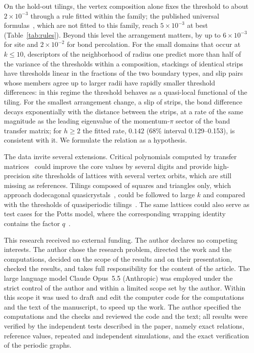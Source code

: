 \documentclass[pre,twocolumn,superscriptaddress,longbibliography,floatfix]{revtex4-2}
\begin{document}
On the hold-out tilings, the vertex composition alone fixes the threshold to about $2\times10^{-3}$ through a rule fitted within the family; the published universal formulas~\cite{GalamMauger96,Neher08,Lebrecht21,GalamMauger98}, which are not fitted to this family, reach $5\times10^{-3}$ at best (Table~\ref{tab:rules}). Beyond this level the arrangement matters, by up to $6\times10^{-3}$ for site and $2\times10^{-2}$ for bond percolation. For the small domains that occur at $k\le10$, descriptors of the neighborhood of radius one predict more than half of the variance of the thresholds within a composition, stackings of identical strips have thresholds linear in the fractions of the two boundary types, and slip pairs whose members agree up to larger radii have rapidly smaller threshold differences: in this regime the threshold behaves as a quasi-local functional of the tiling. For the smallest arrangement change, a slip of strips, the bond difference decays exponentially with the distance between the strips, at a rate of the same magnitude as the leading eigenvalue of the momentum-$\pi$ sector of the band transfer matrix; for $h\ge2$ the fitted rate, $0.142$ (68\% interval 0.129--0.153), is consistent with it. We formulate the relation as a hypothesis.

The data invite several extensions. Critical polynomials computed by transfer matrices~\cite{Jacobsen14,ScullardJacobsen20} could improve the core values by several digits and provide high-precision site thresholds of lattices with several vertex orbits, which are still missing as references. Tilings composed of squares and triangles only, which approach dodecagonal quasicrystals~\cite{OxborrowHenley93}, could be followed to large $k$ and compared with the thresholds of quasiperiodic tilings~\cite{Babalievski95,ZiffBabalievski99}. The same lattices could also serve as test cases for the Potts model, where the corresponding wrapping identity contains the factor $q$~\cite{Arguin02,JacobsenScullard13}.

\begin{acknowledgments}
This research received no external funding. The author declares no competing interests. The author chose the research problem, directed the work and the computations, decided on the scope of the results and on their presentation, checked the results, and takes full responsibility for the content of the article. The large language model Claude Opus~5.5 (Anthropic) was employed under the strict control of the author and within a limited scope set by the author. Within this scope it was used to draft and edit the computer code for the computations and the text of the manuscript, to speed up the work. The author specified the computations and the checks and reviewed the code and the text; all results were verified by the independent tests described in the paper, namely exact relations, reference values, repeated and independent simulations, and the exact verification of the periodic graphs.
\end{acknowledgments}
\end{document}
